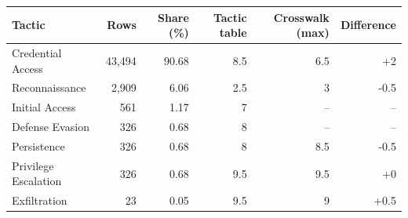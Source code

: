 \begin{tabular}{lrrrrr}
\toprule
Tactic & Rows & Share (\%) & Tactic table & Crosswalk (max) & Difference \\
\midrule
Credential Access & 43,494 & 90.68 & 8.5 & 6.5 & +2 \\
Reconnaissance & 2,909 & 6.06 & 2.5 & 3 & -0.5 \\
Initial Access & 561 & 1.17 & 7 & -- & -- \\
Defense Evasion & 326 & 0.68 & 8 & -- & -- \\
Persistence & 326 & 0.68 & 8 & 8.5 & -0.5 \\
Privilege Escalation & 326 & 0.68 & 9.5 & 9.5 & +0 \\
Exfiltration & 23 & 0.05 & 9.5 & 9 & +0.5 \\
\bottomrule
\end{tabular}

